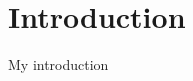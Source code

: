 \documentclass{standalone}
\begin{document}
	\section{Introduction}
		My introduction
\end{document}
